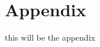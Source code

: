 \documentclass[oneside,a4paper,11pt]{report}
\begin{document}







\clearpage

\appendix
\section*{Appendix}
this will be the appendix
\end{document}
